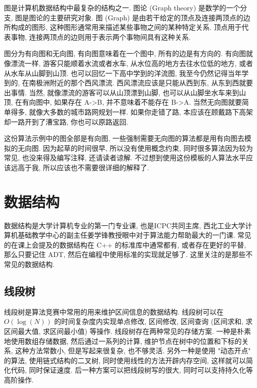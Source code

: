 \documentclass[a4paper]{ctexbook}
\begin{document}
图是计算机数据结构中最复杂的结构之一. 图论 (Graph theory) 是数学的一个分支, 图是图论的主要研究对象. 图 (Graph) 是由若干给定的顶点及连接两顶点的边所构成的图形, 这种图形通常用来描述某些事物之间的某种特定关系. 顶点用于代表事物, 连接两顶点的边则用于表示两个事物间具有这种关系.

图分为有向图和无向图, 有向图意味着在一个图中, 所有的边是有方向的. 有向图就像漂流一样, 游客只能顺着水流或者水车, 从水位高的地方去往水位低的地方, 或者从水车从山脚到山顶. 也可以回忆一下高中学到的洋流图, 我至今仍然记得当年学到的, 在南极洲附近的那个西风漂流. 西风漂流应该是只能从西到东, 从东到西就要出事情. 当然, 就像漂流的游客可以从山顶漂到山脚, 也可以从山脚坐水车来到山顶, 在有向图中, 如果存在 A->B, 并不意味着不能存在 B->A. 当然无向图就要简单得多, 就像大多数的城市路网规划一样. 如果你走错了路, 本应该在顾戴路下高架却一路开到了漕宝路, 你也可以原路返回.

这份算法示例中的图全部是有向图, 一些强制需要无向图的算法都是用有向图去模拟的无向图. 因为起草的时间很早, 所以没有使用概念约束, 同时很多算法因为较为常见, 也没来得及编写注释, 还请读者谅解. 不过想到使用这份模板的人算法水平应该远高于我, 所以应该也不需要很详细的解释了.



\chapter{数据结构}

数据结构是大学计算机专业的第一门专业课, 也是ICPC共同主席, 西北工业大学计算机基础教学中心的副主任姜学锋教授眼中对于算法能力帮助最大的一门课. 常见的在课上会提及的数据结构在 C++ 的标准库中通常都有, 或者存在更好的平替, 那么只要记住 ADT, 然后在编程中使用标准的实现就足够了. 这里关注的是那些不常见的数据结构.

\section{线段树}

线段树是算法竞赛中常用的用来维护区间信息的数据结构. 线段树可以在 $O(\log(N))$ 的时间复杂度内实现单点修改, 区间修改, 区间查询 (区间求和, 求区间最大值, 求区间最小值) 等操作. 线段树存在两种常见的存储方案. 一种是朴素地使用数组存储数据, 然后通过一系列的计算, 维护节点在树中的位置和下标的关系, 这种方法常数小, 但是写起来很复杂, 也不够灵活. 另外一种是使用 "动态开点" 的算法, 使用链式结构的二叉树, 同时使用线性的方法开辟内存空间, 这样就可以简化代码, 同时保证速度. 后一种方案可以把线段树写的很大, 同时可以支持持久化等高阶操作.
\end{document}
